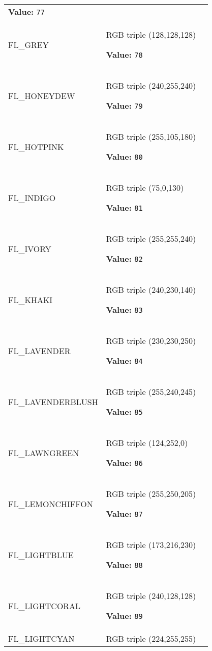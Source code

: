 \begin{longtable}{|p{\varnamewidth}|p{\vardescrwidth}|l}
\textbf{Value:} 
{\tt 77}&\\
\cline{1-2}
\raggedright F\-L\-\_\-G\-R\-E\-Y\- & \raggedright RGB triple (128,128,128)

\textbf{Value:} 
{\tt 78}&\\
\cline{1-2}
\raggedright F\-L\-\_\-H\-O\-N\-E\-Y\-D\-E\-W\- & \raggedright RGB triple (240,255,240)

\textbf{Value:} 
{\tt 79}&\\
\cline{1-2}
\raggedright F\-L\-\_\-H\-O\-T\-P\-I\-N\-K\- & \raggedright RGB triple (255,105,180)

\textbf{Value:} 
{\tt 80}&\\
\cline{1-2}
\raggedright F\-L\-\_\-I\-N\-D\-I\-G\-O\- & \raggedright RGB triple (75,0,130)

\textbf{Value:} 
{\tt 81}&\\
\cline{1-2}
\raggedright F\-L\-\_\-I\-V\-O\-R\-Y\- & \raggedright RGB triple (255,255,240)

\textbf{Value:} 
{\tt 82}&\\
\cline{1-2}
\raggedright F\-L\-\_\-K\-H\-A\-K\-I\- & \raggedright RGB triple (240,230,140)

\textbf{Value:} 
{\tt 83}&\\
\cline{1-2}
\raggedright F\-L\-\_\-L\-A\-V\-E\-N\-D\-E\-R\- & \raggedright RGB triple (230,230,250)

\textbf{Value:} 
{\tt 84}&\\
\cline{1-2}
\raggedright F\-L\-\_\-L\-A\-V\-E\-N\-D\-E\-R\-B\-L\-U\-S\-H\- & \raggedright RGB triple (255,240,245)

\textbf{Value:} 
{\tt 85}&\\
\cline{1-2}
\raggedright F\-L\-\_\-L\-A\-W\-N\-G\-R\-E\-E\-N\- & \raggedright RGB triple (124,252,0)

\textbf{Value:} 
{\tt 86}&\\
\cline{1-2}
\raggedright F\-L\-\_\-L\-E\-M\-O\-N\-C\-H\-I\-F\-F\-O\-N\- & \raggedright RGB triple (255,250,205)

\textbf{Value:} 
{\tt 87}&\\
\cline{1-2}
\raggedright F\-L\-\_\-L\-I\-G\-H\-T\-B\-L\-U\-E\- & \raggedright RGB triple (173,216,230)

\textbf{Value:} 
{\tt 88}&\\
\cline{1-2}
\raggedright F\-L\-\_\-L\-I\-G\-H\-T\-C\-O\-R\-A\-L\- & \raggedright RGB triple (240,128,128)

\textbf{Value:} 
{\tt 89}&\\
\cline{1-2}
\raggedright F\-L\-\_\-L\-I\-G\-H\-T\-C\-Y\-A\-N\- & \raggedright RGB triple (224,255,255)


\end{longtable}
